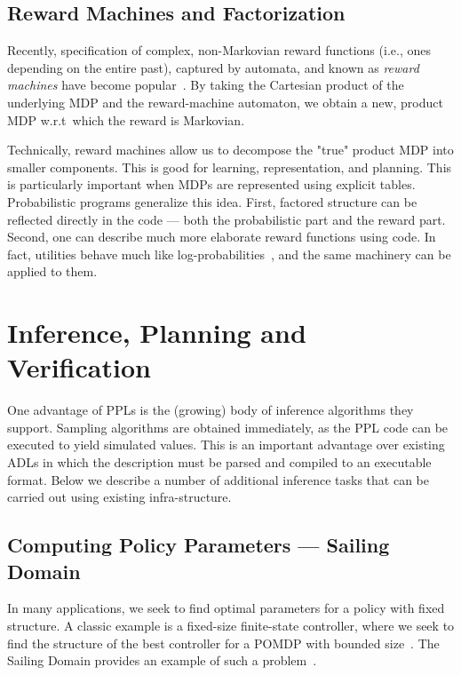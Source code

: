 \documentclass[letterpaper]{article} %
\theoremstyle{definition}
\begin{document}
\subsection{Reward Machines and Factorization}
Recently, specification of complex, non-Markovian reward functions (i.e., ones depending on the entire past), captured by automata, and known as {\em reward machines} have become popular~\cite{RewardMachines}.
By taking the Cartesian product of
the underlying MDP and the reward-machine automaton, we
obtain a new, product MDP w.r.t~which the reward is Markovian.

Technically, reward machines allow us to decompose the "true" product MDP into smaller components. This is good for learning, representation, and planning. This is particularly important when MDPs are represented using
explicit tables. Probabilistic programs generalize this idea.
First, factored structure can be reflected directly in the code --- both the probabilistic part and the reward part. 
Second, one can describe much more elaborate reward functions using code. In fact, utilities behave much like log-probabilities~\cite{wgr+:11,mpt+:16}, and the same machinery can be applied to them. 




\section{Inference, Planning and Verification}
One advantage of PPLs is the (growing) body of inference algorithms they support. Sampling algorithms are obtained immediately, as the PPL code can be executed to yield simulated values. This is an important advantage over existing ADLs in which the description must be parsed and compiled to
an executable format. 
Below we describe a number of additional inference tasks that can
be carried out using existing infra-structure.

\subsection{Computing Policy Parameters --- Sailing Domain}
In many applications, we seek to find optimal parameters for a policy
with fixed structure. A classic example is a fixed-size finite-state
controller, where we seek to find the structure of the best controller
for a POMDP with bounded size~\cite{meuleau1999learning,Poupart3}. The
Sailing Domain provides an example of such a problem~\cite{pg:04,ts:12}. 
\end{document}

